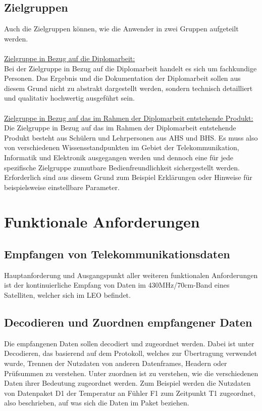 \subsection{Zielgruppen}
Auch die Zielgruppen können, wie die Anwender in zwei Gruppen aufgeteilt werden.\\
\\
\underline{Zielgruppe in Bezug auf die Diplomarbeit: }\\
Bei der Zielgruppe in Bezug auf die Diplomarbeit handelt es sich um fachkundige Personen. Das 
Ergebnis und die Dokumentation der Diplomarbeit sollen aus diesem Grund nicht zu abstrakt 
dargestellt werden, sondern technisch detailliert und qualitativ hochwertig ausgeführt sein.\\
\\
\underline{Zielgruppe in Bezug auf das im Rahmen der Diplomarbeit entstehende Produkt: }\\
Die Zielgruppe in Bezug auf das im Rahmen der Diplomarbeit entstehende Produkt besteht aus 
Schülern und Lehrpersonen aus AHS und BHS. Es muss also von verschiedenen Wissensstandpunkten 
im Gebiet der Telekommunikation, Informatik und Elektronik ausgegangen werden und dennoch eine 
für jede spezifische Zielgruppe zumutbare Bedienfreundlichkeit sichergestellt werden. Erforderlich 
sind aus diesem Grund zum Beispiel Erklärungen oder Hinweise für beispielsweise einstellbare 
Parameter. 

\section{Funktionale Anforderungen}
\subsection{Empfangen von Telekommunikationsdaten}
Hauptanforderung und Ausgangspunkt aller weiteren funktionalen Anforderungen ist der 
kontinuierliche Empfang von Daten im 430MHz/70cm-Band eines Satelliten, welcher sich im LEO 
befindet.\\

\subsection{Decodieren und Zuordnen empfangener Daten}
Die empfangenen Daten sollen decodiert und zugeordnet werden. Dabei ist unter Decodieren, das 
basierend auf dem Protokoll, welches zur Übertragung verwendet wurde, Trennen der Nutzdaten von 
anderen Datenframes, Headern oder Prüfsummen zu verstehen. Unter zuordnen ist zu verstehen, wie 
die verschiedenen Daten ihrer Bedeutung zugeordnet werden. Zum Beispiel werden die Nutzdaten von 
Datenpaket D1 der Temperatur an Fühler F1 zum Zeitpunkt T1 zugeordnet, also beschrieben, auf was 
sich die Daten im Paket beziehen.\\

